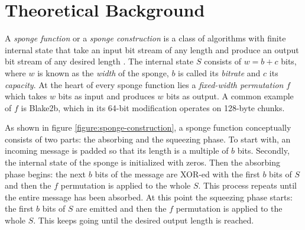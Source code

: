 \chapter{Theoretical Background}
\label{sec:fundamentals}

A \emph{sponge function} or a \emph{sponge construction} is a class of algorithms with finite internal state that take an input bit stream of any length and produce an output bit stream of any desired length \cite{wiki:2017:sponge-function}. The internal state \(S\) consists of \(w = b + c\) bits, where \(w\) is known as the \emph{width} of the sponge, \(b\) is called its \emph{bitrate} and \(c\) its \emph{capacity}. At the heart of every sponge function lies a \emph{fixed-width permutation} \(f\) which takes \(w\) bits as input and produces \(w\) bits as output. A common example of \(f\) is Blake2b, which in its 64-bit modification operates on 128-byte chunks.

As shown in figure \ref{figure:sponge-construction}, a sponge function conceptually consists of two parts: the absorbing and the squeezing phase. To start with, an incoming message is padded so that its length is a multiple of \(b\) bits. Secondly, the internal state of the sponge is initialized with zeros. Then the absorbing phase begins: the next \(b\) bits of the message are XOR-ed with the first \(b\) bits of \(S\) and then the \(f\) permutation is applied to the whole \(S\). This process repeats until the entire message has been absorbed. At this point the squeezing phase starts: the first \(b\) bits of \(S\) are emitted and then the \(f\) permutation is applied to the whole \(S\). This keeps going until the desired output length is reached.

